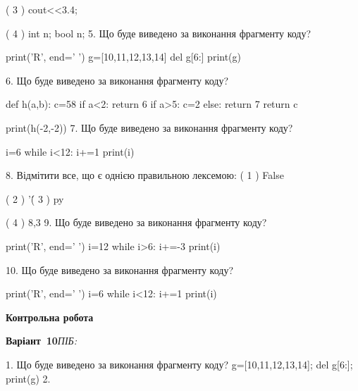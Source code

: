 \documentclass[11pt]{article}
\begin{document}
( 3 ) cout<<3.4;

( 4 ) int n; bool n;
\vspace{5mm}
5. Що буде виведено за виконання фрагменту коду?

print('R', end=' ')
g=[10,11,12,13,14]
del g[6:]
print(g)

\vspace{5mm}
6. Що буде виведено за виконання фрагменту коду?

def h(a,b):
    c=58
    if a<2:
        return 6
    if a>5:
         c=2
    else: 
        return 7
    return c

print(h(-2,-2))
\vspace{5mm}
7. Що буде виведено за виконання фрагменту коду?

i=6
while i<12:
    i+=1
print(i)

\vspace{5mm}
8. %
Відмітити все, що є однією правильною лексемою:
( 1 ) False

( 2 ) '\'

( 3 ) py

( 4 ) 8,3
\vspace{5mm}
9. Що буде виведено за виконання фрагменту коду?

print('R', end=' ')
i=12
while i>6:
    i+=-3
print(i)

\vspace{5mm}
10. Що буде виведено за виконання фрагменту коду?

print('R', end=' ')
i=6
while i<12:
    i+=1
print(i)

\vspace{5mm}










\newpage

\newpage

{\large\textbf{Контрольна робота}}

\textbf{Варіант \No\,10}\hfill \textit{ПІБ:}\,\underline{\hspace{60mm}}
\vspace{4mm}

1. Що буде виведено за виконання фрагменту коду?
g=[10,11,12,13,14]; del g[6:]; print(g)\vspace{5mm}
2. 
\end{document}
